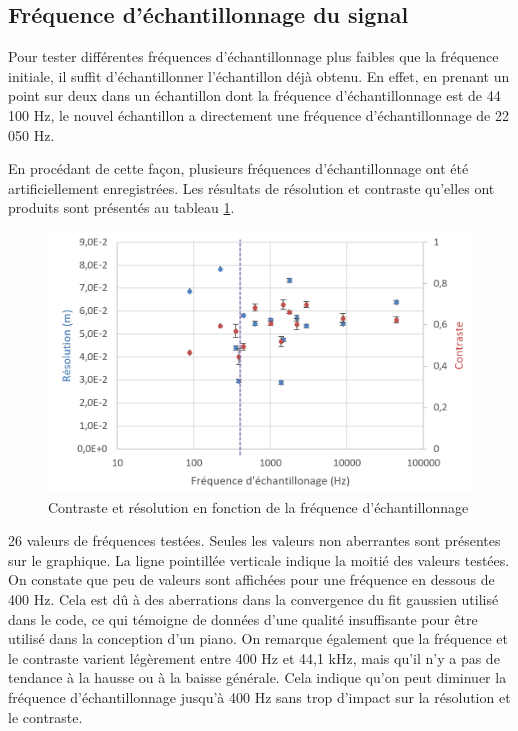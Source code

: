 ﻿\documentclass[11pt,letterpaper]{article}
\begin{document}
\subsection{Fréquence d'échantillonnage du signal}

Pour tester différentes fréquences d'échantillonnage plus faibles que la 
fréquence initiale, il suffit d'échantillonner l'échantillon déjà obtenu. En
effet, en prenant un point sur deux dans un échantillon dont la fréquence
d'échantillonnage est de 44 100 Hz, le nouvel échantillon a directement une
fréquence d'échantillonnage de 22 050 Hz. 

En procédant de cette façon, plusieurs fréquences d'échantillonnage ont été
artificiellement enregistrées. Les résultats de résolution et contraste 
qu'elles ont produits sont présentés au tableau \ref{fs_fig}.

\begin{figure}[ht]
    \centering
    \includegraphics[scale=0.75]{Graphique_fs.png}
    \caption{Contraste et résolution en fonction de la fréquence d'échantillonnage}
    \label{fs_fig}
  \end{figure}

26 valeurs de fréquences testées. Seules les valeurs non aberrantes sont
présentes sur le graphique. La ligne pointillée verticale indique 
la moitié des valeurs testées. On constate  que peu de valeurs sont affichées
pour une fréquence en dessous de 400 Hz. Cela est dû à des aberrations dans
la convergence du fit gaussien utilisé dans le code, ce qui témoigne de 
données d'une qualité insuffisante pour être utilisé dans la conception d'un
piano. 
On remarque également que la fréquence et le contraste varient légèrement entre 
400 Hz et 44,1 kHz, mais qu'il n'y a pas de tendance à la hausse ou à la baisse 
générale. Cela indique qu'on peut diminuer la fréquence d'échantillonnage 
jusqu'à 400 Hz sans trop d'impact sur la résolution et le contraste.
\end{document}
